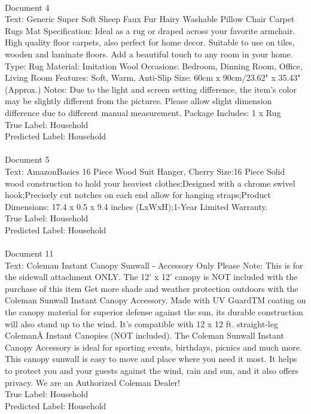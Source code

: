 \documentclass[a4paper,12pt]{article}
\begin{document}
{\\ Document 4\\
Text: Generic Super Soft Sheep Faux Fur Hairy Washable Pillow Chair Carpet Rugs Mat Specification: Ideal as a rug or draped across your favorite armchair. High quality floor carpets, also perfect for home decor. Suitable to use on tiles, wooden and laminate floors. Add a beautiful touch to any room in your home. Type: Rug Material: Imitation Wool Occasions: Bedroom, Dinning Room, Office, Living Room Features: Soft, Warm, Anti-Slip Size: 60cm x 90cm/23.62" x 35.43" (Approx.) Notes: Due to the light and screen setting difference, the item's color may be slightly different from the pictures. Please allow slight dimension difference due to different manual measurement. Package Includes: 1 x Rug\\
True Label: Household\\
Predicted Label: Household\\
\\Document 5\\
Text: AmazonBasics 16 Piece Wood Suit Hanger, Cherry Size:16 Piece   Solid wood construction to hold your heaviest clothes;Designed with a chrome swivel hook;Precisely cut notches on each end allow for hanging straps;Product Dimensions: 17.4 x 0.5 x 9.4 inches (LxWxH);1-Year Limited Warranty.\\
True Label: Household\\
Predicted Label: Household\\
\\Document 11\\
Text: Coleman Instant Canopy Sunwall - Accessory Only Please Note: This is for the sidewall attachment ONLY. The 12' x 12' canopy is NOT included with the purchase of this item Get more shade and weather protection outdoors with the Coleman Sunwall Instant Canopy Accessory. Made with UV GuardTM coating on the canopy material for superior defense against the sun, its durable construction will also stand up to the wind. It's compatible with 12 x 12 ft. straight-leg ColemanÂ Instant Canopies (NOT included). The Coleman Sunwall Instant Canopy Accessory is ideal for sporting events, birthdays, picnics and much more. This canopy sunwall is easy to move and place where you need it most. It helps to protect you and your guests against the wind, rain and sun, and it also offers privacy. We are an Authorized Coleman Dealer!\\
True Label: Household\\
Predicted Label: Household\\
}
\end{document}

